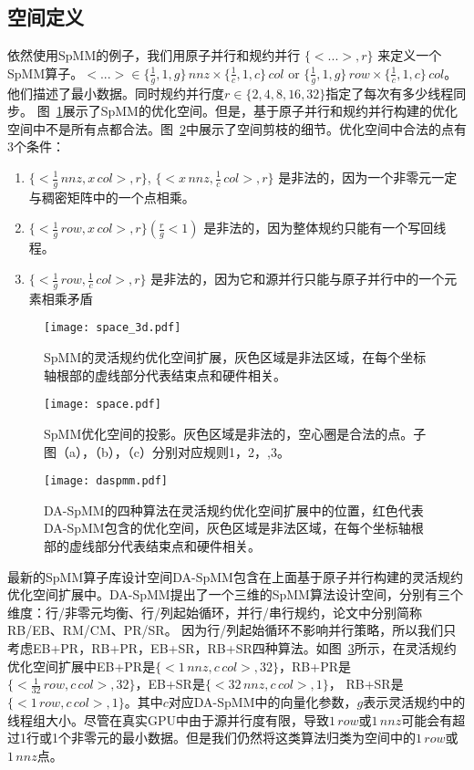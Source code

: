 \subsection{空间定义}\label{sec:spacedef}
依然使用SpMM的例子，我们用原子并行和规约并行 $\{<...>,r\}$ 来定义一个SpMM算子。$<...>\in \{\frac{1}{g},1,g\}\, nnz \times \{\frac{1}{c},1,c\}\, col $ or $\{\frac{1}{g},1,g\}\,row \times \{\frac{1}{c},1,c\}\,col$。他们描述了最小数据。同时规约并行度$r\in\{2,4,8,16,32\}$指定了每次有多少线程同步。 
图~\ref{fig:space3d}展示了SpMM的优化空间。但是，基于原子并行和规约并行构建的优化空间中不是所有点都合法。图~\ref{fig:space}中展示了空间剪枝的细节。优化空间中合法的点有3个条件：
\begin{enumerate}
  \item $\{<\frac{1}{g}\,nnz , x\,col>,r\}$, $\{<x\,nnz , \frac{1}{c}\,col>,r\}$ 
  是非法的，因为一个非零元一定与稠密矩阵中的一个点相乘。
  \item $\{<\frac{1}{g}\,row, x\,col>,r\}(\frac{r}{g}<1)$
  是非法的，因为整体规约只能有一个写回线程。
  \item $\{<\frac{1}{g}\,row , \frac{1}{c}\,col>,r\}$
  是非法的，因为它和源并行只能与原子并行中的一个元素相乘矛盾
\end{enumerate}
\begin{figure}[h]%
  \centering
  \texttt{[image: space\_3d.pdf]}
  \caption{SpMM的灵活规约优化空间扩展，灰色区域是非法区域，在每个坐标轴根部的虚线部分代表结束点和硬件相关。}
  \label{fig:space3d}
\end{figure}
\begin{figure}[h]%
  \centering
  \texttt{[image: space.pdf]}
  \caption{SpMM优化空间的投影。灰色区域是非法的，空心圈是合法的点。子图（a），（b），（c）分别对应规则1，2，,3。}
  \label{fig:space}
\end{figure}
\begin{figure}[h]%
  \centering
  \texttt{[image: daspmm.pdf]}
  \caption{DA-SpMM的四种算法在灵活规约优化空间扩展中的位置，红色代表DA-SpMM包含的优化空间，灰色区域是非法区域，在每个坐标轴根部的虚线部分代表结束点和硬件相关。}
  \label{fig:daspmm}
\end{figure}
最新的SpMM算子库设计空间DA-SpMM包含在上面基于原子并行构建的灵活规约优化空间扩展中。DA-SpMM提出了一个三维的SpMM算法设计空间，分别有三个维度：行/非零元均衡、行/列起始循环，并行/串行规约，论文中分别简称RB/EB、RM/CM、PR/SR。
因为行/列起始循环不影响并行策略，所以我们只考虑EB+PR，RB+PR，EB+SR，RB+SR四种算法。如图~\ref{fig:daspmm}所示，在灵活规约优化空间扩展中EB+PR是$\{<1\,nnz , c\,col>,32\}$，RB+PR是$\{<\frac{1}{32}\,row, c\,col>,32\}$，EB+SR是$\{<32\,nnz,c\,col >,1\}$，
RB+SR是$\{<1\,row,c\,col >,1\}$。其中$c$对应DA-SpMM中的向量化参数，$g$表示灵活规约中的线程组大小。尽管在真实GPU中由于源并行度有限，导致$1\,row$或$1\,nnz$可能会有超过1行或1个非零元的最小数据。但是我们仍然将这类算法归类为空间中的$1\,row$或$1\,nnz$点。


